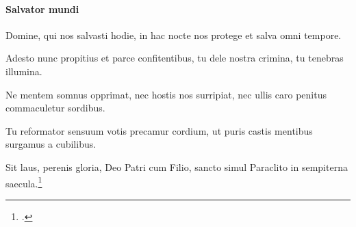 
\paragraph{Salvator mundi} Domine,
qui nos salvasti hodie,
in hac nocte nos protege
et salva omni tempore.

Adesto nunc propitius
et parce confitentibus,
tu dele nostra crimina,
tu tenebras illumina.

Ne mentem somnus opprimat,
nec hostis nos surripiat,
nec ullis caro penitus
commaculetur sordibus.

Tu reformator sensuum
votis precamur cordium,
ut puris castis mentibus
surgamus a cubilibus.

Sit laus, perenis gloria,
Deo Patri cum Filio,
sancto simul Paraclito
in sempiterna saecula.\footcite[53r]{bp1502}
